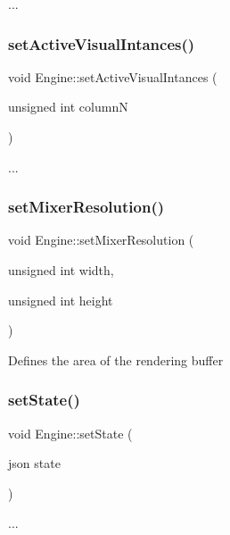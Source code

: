 ... \mbox{\label{class_engine_a9f4d3c2ac126aa622fa464300d1d361c}} 
\subsubsection{\texorpdfstring{set\+Active\+Visual\+Intances()}{setActiveVisualIntances()}}
{\footnotesize\ttfamily void Engine\+::set\+Active\+Visual\+Intances (\begin{DoxyParamCaption}\item[{unsigned int}]{columnN }\end{DoxyParamCaption})}

... \mbox{\label{class_engine_a368d1d6924b49241c994b2857606421b}} 
\subsubsection{\texorpdfstring{set\+Mixer\+Resolution()}{setMixerResolution()}}
{\footnotesize\ttfamily void Engine\+::set\+Mixer\+Resolution (\begin{DoxyParamCaption}\item[{unsigned int}]{width,  }\item[{unsigned int}]{height }\end{DoxyParamCaption})}

Defines the area of the rendering buffer \mbox{\label{class_engine_aa04b3d433a32a2b7baa6df9141d7a911}} 
\subsubsection{\texorpdfstring{set\+State()}{setState()}}
{\footnotesize\ttfamily void Engine\+::set\+State (\begin{DoxyParamCaption}\item[{json}]{state }\end{DoxyParamCaption})}

... \mbox{\label{class_engine_a7b198cae741a0031f89dab6844e44ed2}} 
